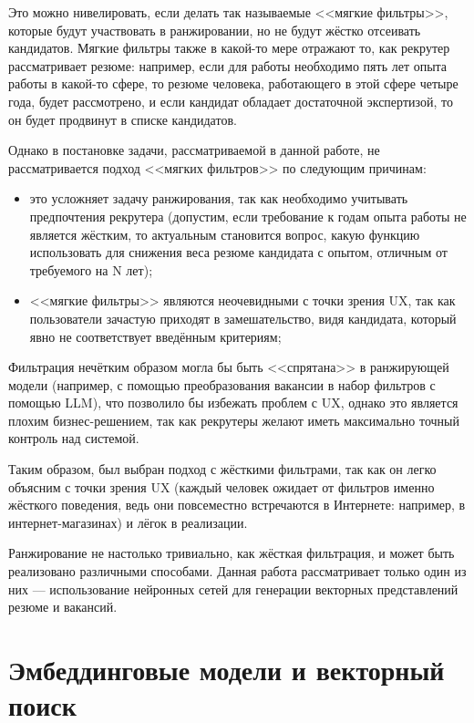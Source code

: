 \documentclass[14pt]{mmcs_article}
\begin{document}
Это можно нивелировать, если делать так называемые <<мягкие фильтры>>, которые будут участвовать в ранжировании, но не будут жёстко отсеивать кандидатов. Мягкие фильтры также в какой-то мере отражают то, как рекрутер рассматривает резюме: например, если для работы необходимо пять лет опыта работы в какой-то сфере, то резюме человека, работающего в этой сфере четыре года, будет рассмотрено, и если кандидат обладает достаточной экспертизой, то он будет продвинут в списке кандидатов.

Однако в постановке задачи, рассматриваемой в данной работе, не рассматривается подход <<мягких фильтров>> по следующим причинам:

\begin{itemize}
  \item это усложняет задачу ранжирования, так как необходимо учитывать предпочтения рекрутера (допустим, если требование к годам опыта работы не является жёстким, то актуальным становится вопрос, какую функцию использовать для снижения веса резюме кандидата с опытом, отличным от требуемого на N лет);
  \item <<мягкие фильтры>> являются неочевидными с точки зрения UX, так как пользователи зачастую приходят в замешательство, видя кандидата, который явно не соответствует введённым критериям;
\end{itemize}

Фильтрация нечётким образом могла бы быть <<спрятана>> в ранжирующей модели (например, с помощью преобразования вакансии в набор фильтров с помощью LLM), что позволило бы избежать проблем с UX, однако это является плохим бизнес-решением, так как рекрутеры желают иметь максимально точный контроль над системой.

Таким образом, был выбран подход с жёсткими фильтрами, так как он легко объясним с точки зрения UX (каждый человек ожидает от фильтров именно жёсткого поведения, ведь они повсеместно встречаются в Интернете: например, в интернет-магазинах) и лёгок в реализации.

Ранжирование не настолько тривиально, как жёсткая фильтрация, и может быть реализовано различными способами. Данная работа рассматривает только один из них --- использование нейронных сетей для генерации векторных представлений резюме и вакансий.


\newpage
\section{Эмбеддинговые модели и векторный поиск}\label{embedding_models}
\end{document}
